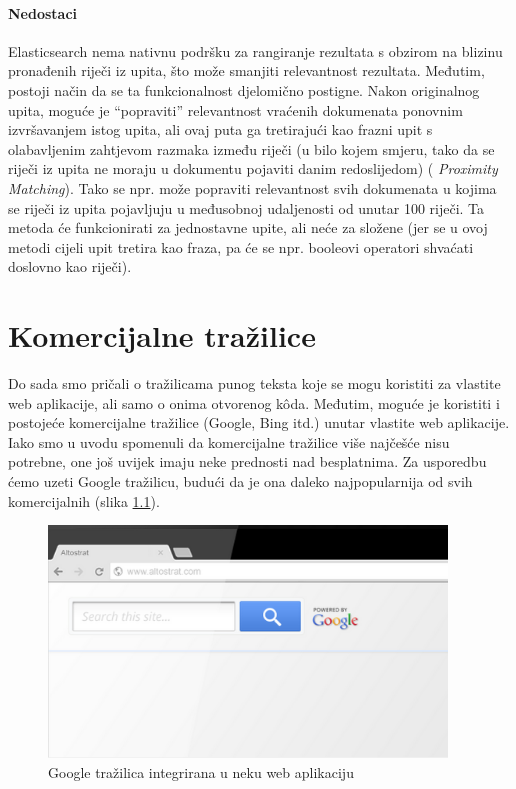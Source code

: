 \documentclass[a4paper,twoside,12pt]{scrreprt}
\begin{document}
\subsubsection{Nedostaci}

Elasticsearch nema nativnu podršku za rangiranje rezultata s obzirom na blizinu pronađenih riječi iz upita, što može smanjiti relevantnost rezultata. Međutim, postoji način da se ta funkcionalnost djelomično postigne. Nakon originalnog upita, moguće je ``popraviti'' relevantnost vraćenih dokumenata ponovnim izvršavanjem istog upita, ali ovaj puta ga tretirajući kao frazni upit s olabavljenim zahtjevom razmaka između riječi (u bilo kojem smjeru, tako da se riječi iz upita ne moraju u dokumentu pojaviti danim redoslijedom) (\cite{elasticguide} \textit{Proximity Matching}). Tako se npr. može popraviti relevantnost svih dokumenata u kojima se riječi iz upita pojavljuju u međusobnoj udaljenosti od unutar 100 riječi. Ta metoda će funkcionirati za jednostavne upite, ali neće za složene (jer se u ovoj metodi cijeli upit tretira kao fraza, pa će se npr. booleovi operatori shvaćati doslovno kao riječi).

\chapter{Komercijalne tražilice}

Do sada smo pričali o tražilicama punog teksta koje se mogu koristiti za vlastite web aplikacije, ali samo o onima otvorenog kôda. Međutim, moguće je koristiti i postojeće komercijalne tražilice (Google, Bing itd.) unutar vlastite web aplikacije. Iako smo u uvodu spomenuli da komercijalne tražilice više najčešće nisu potrebne, one još uvijek imaju neke prednosti nad besplatnima. Za usporedbu ćemo uzeti Google tražilicu, budući da je ona daleko najpopularnija od svih komercijalnih (slika \ref{google}).

\begin{figure}[H]
  \centering
  \includegraphics[width=300pt]{google}
  \caption{Google tražilica integrirana u neku web aplikaciju}
  \label{google}
\end{figure}
\end{document}
